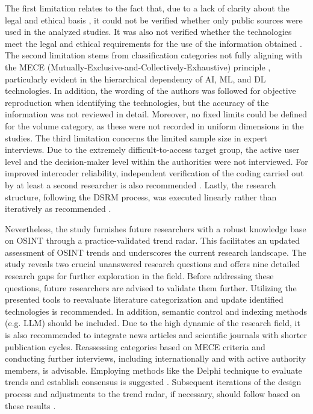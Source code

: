 \documentclass[10pt]{article}
\begin{document}
{The first limitation relates to the fact that, due to a lack of clarity about the legal
and ethical basis \cite{Ghioni.2023,Unver.2018,Wittmer.2022},
it could not be verified whether only public sources \cite{NorthAtlanticTreatyOrganization.2002} were used
in the analyzed studies. It was also not verified whether the technologies meet the
legal and ethical requirements for the use of the information obtained
\cite{PastorGalindo.2020,Wittmer.2022}. The second
limitation stems from classification categories not fully aligning with the
MECE (Mutually-Exclusive-and-Collectively-Exhaustive) principle \cite{Lee.2018,Rasiel.1999},
particularly evident in the hierarchical dependency of AI, ML, and DL technologies. In addition,
the wording of the authors was followed for objective reproduction when identifying the technologies,
but the accuracy of the information was not reviewed in detail. Moreover, no fixed limits could be defined
for the volume category, as these were not recorded in uniform dimensions in the studies.
The third limitation concerns the limited sample size in expert interviews. Due to the
extremely difficult-to-access target group, the active user level and the decision-maker
level within the authorities were not interviewed. For improved intercoder reliability,
independent verification of the coding carried out by at least a second researcher
is also recommended \cite{Bogner.2002c,Glaser.2009,MAXQDA.16.03.2020}.
Lastly, the research structure, following the DSRM process, was executed linearly rather
than iteratively as recommended \cite{Peffers.2007}.

Nevertheless, the study furnishes future researchers with a robust knowledge base on OSINT
through a practice-validated trend radar. This facilitates an updated assessment of OSINT
trends and underscores the current research landscape. The study reveals two crucial
unanswered research questions and offers nine detailed research gaps for further exploration
in the field. Before addressing these questions, future researchers are advised
to validate them further. Utilizing the presented tools to reevaluate literature
categorization and update identified technologies is recommended. In addition, semantic
control and indexing methods (e.g. LLM) should be included. Due to the high dynamic of the research field,
it is also recommended to integrate news articles and scientific journals with shorter publication cycles.
Reassessing categories based on MECE criteria and conducting further interviews, including internationally
and with active authority members, is advisable. Employing methods like the Delphi technique to evaluate
trends and establish consensus is suggested \cite{Hader.2000}. Subsequent iterations of the design process and adjustments
to the trend radar, if necessary, should follow based on these results \cite{Peffers.2007,Sonnenberg.2012}.

}
\end{document}
